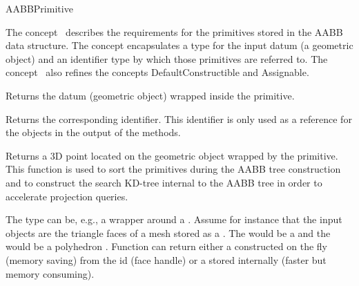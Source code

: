 \ccRefPageBegin


\begin{ccRefConcept}{AABBPrimitive}


\ccDefinition
  
The concept \ccRefName\ describes the requirements for the primitives stored in the AABB data structure. The concept encapsulates a type for the input datum (a geometric object) and an identifier type by which those primitives are referred to. The concept \ccRefName\ also refines the concepts DefaultConstructible and Assignable.

\ccTypes






\ccOperations

{Returns the datum (geometric object) wrapped inside the primitive.}

{Returns the corresponding identifier. This identifier is only used as a reference for the objects in the output of the  methods.}

{Returns a 3D point located on the geometric object wrapped by the primitive. This function is used to sort the primitives during the AABB tree construction and to construct the search KD-tree internal to the AABB tree in order to accelerate projection queries.}

\ccSeeAlso
{}

\ccExample

The  type can be, e.g., a wrapper around a . Assume for instance that the input objects are the triangle faces of a mesh stored as a . The  would be a  and the  would be a polyhedron . Function  can return either a  constructed on the fly (memory saving) from the id (face handle) or a  stored internally (faster but memory consuming). 

\end{ccRefConcept}

\ccRefPageEnd

